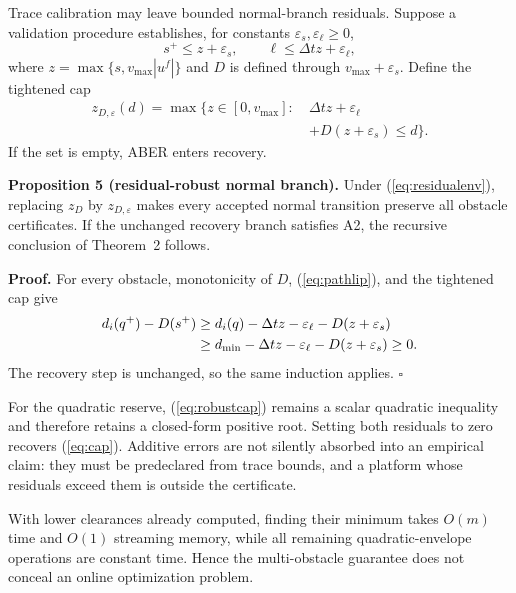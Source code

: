 \documentclass[letterpaper]{article}
\begin{document}
Trace calibration may leave bounded normal-branch residuals.  Suppose a
validation procedure establishes, for constants
$\varepsilon_s,\varepsilon_\ell\ge0$,
\begin{equation}
 s^+\le z+\varepsilon_s,
 \qquad \ell\le\Delta t z+\varepsilon_\ell,             \label{eq:residualenv}
\end{equation}
where $z=\max\{s,v_{\max}|u^f|\}$ and $D$ is defined through
$v_{\max}+\varepsilon_s$.  Define the tightened cap
\begin{equation}
\begin{aligned}
 z_{D,\varepsilon}(d)=\max\bigl\{z\in[0,v_{\max}]:\ &
 \Delta t z+\varepsilon_\ell\\
 &+D(z+\varepsilon_s)\le d\bigr\}.
\end{aligned}                                           \label{eq:robustcap}
\end{equation}
If the set is empty, ABER enters recovery.

\textbf{Proposition 5 (residual-robust normal branch).}
Under (\ref{eq:residualenv}), replacing $z_D$ by
$z_{D,\varepsilon}$ makes every accepted normal transition preserve all
obstacle certificates.  If the unchanged recovery branch satisfies A2, the
recursive conclusion of Theorem~2 follows.

\textbf{Proof.}
For every obstacle, monotonicity of $D$, (\ref{eq:pathlip}), and the tightened
cap give
\begin{align}
 d_i(q^+)-D(s^+)
 &\ge d_i(q)-\Delta t z-\varepsilon_\ell
                 -D(z+\varepsilon_s)\notag\\
 &\ge d_{\min}-\Delta t z-\varepsilon_\ell
                 -D(z+\varepsilon_s)\ge0.              \label{eq:residualproof}
\end{align}
The recovery step is unchanged, so the same induction applies. $\square$

For the quadratic reserve, (\ref{eq:robustcap}) remains a scalar quadratic
inequality and therefore retains a closed-form positive root.  Setting both
residuals to zero recovers (\ref{eq:cap}).  Additive errors are not silently
absorbed into an empirical claim: they must be predeclared from trace bounds,
and a platform whose residuals exceed them is outside the certificate.

With lower clearances already computed, finding their minimum takes $O(m)$
time and $O(1)$ streaming memory, while all remaining quadratic-envelope
operations are constant time.  Hence the multi-obstacle guarantee does not
conceal an online optimization problem.
\end{document}
